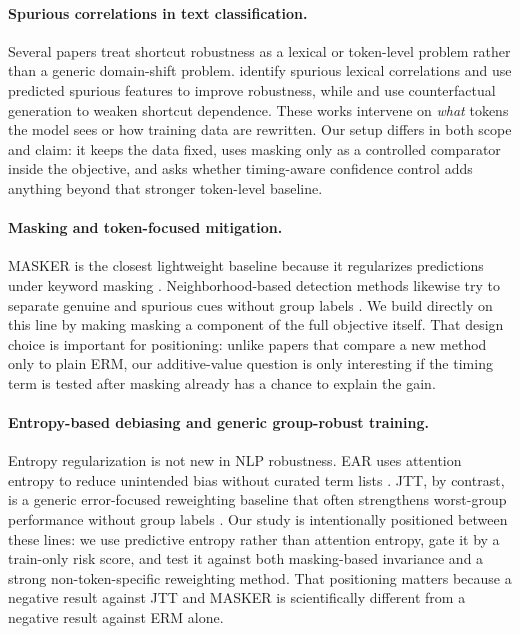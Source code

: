 \documentclass{article}
\begin{document}
\paragraph{Spurious correlations in text classification.}
Several papers treat shortcut robustness as a lexical or token-level problem rather than a generic domain-shift problem. \citet{wang-culotta-2020-identifying} identify spurious lexical correlations and use predicted spurious features to improve robustness, while \citet{wang-culotta-2021-robustness} and \citet{qian-etal-2021-counterfactual} use counterfactual generation to weaken shortcut dependence. These works intervene on \emph{what} tokens the model sees or how training data are rewritten. Our setup differs in both scope and claim: it keeps the data fixed, uses masking only as a controlled comparator inside the objective, and asks whether timing-aware confidence control adds anything beyond that stronger token-level baseline.

\paragraph{Masking and token-focused mitigation.}
MASKER is the closest lightweight baseline because it regularizes predictions under keyword masking \citep{moon-etal-2021-masker}. Neighborhood-based detection methods likewise try to separate genuine and spurious cues without group labels \citep{chew-etal-2024-understanding}. We build directly on this line by making masking a component of the full objective itself. That design choice is important for positioning: unlike papers that compare a new method only to plain ERM, our additive-value question is only interesting if the timing term is tested after masking already has a chance to explain the gain.

\paragraph{Entropy-based debiasing and generic group-robust training.}
Entropy regularization is not new in NLP robustness. EAR uses attention entropy to reduce unintended bias without curated term lists \citep{attanasio-etal-2022-entropy}. JTT, by contrast, is a generic error-focused reweighting baseline that often strengthens worst-group performance without group labels \citep{pmlr-v139-liu21f}. Our study is intentionally positioned between these lines: we use predictive entropy rather than attention entropy, gate it by a train-only risk score, and test it against both masking-based invariance and a strong non-token-specific reweighting method. That positioning matters because a negative result against JTT and MASKER is scientifically different from a negative result against ERM alone.
\end{document}
